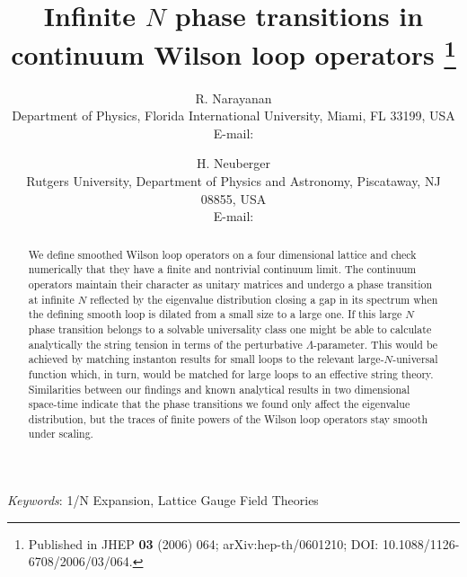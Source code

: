 \documentclass[11pt]{article}
\title{Infinite $N$ phase transitions in continuum Wilson loop operators%
\thanks{Published in JHEP {\bfseries 03} (2006) 064;
arXiv:hep-th/0601210; DOI: 10.1088/1126-6708/2006/03/064.}}
\author{R. Narayanan\\
Department of Physics, Florida International University, Miami,
FL 33199, USA\\
E-mail: \email{rajamani.narayanan@fiu.edu}
\and H. Neuberger\\
Rutgers University, Department of Physics and Astronomy,
Piscataway, NJ 08855, USA\\
E-mail: \email{neuberg@physics.rutgers.edu}}
\date{}
\begin{document}
\maketitle

\begin{abstract}
We define smoothed Wilson loop operators on a four
dimensional lattice and check numerically that they have a finite
and nontrivial continuum limit. The continuum operators maintain
their character as unitary matrices and undergo a phase transition
at infinite $N$ reflected by the eigenvalue distribution closing a
gap in its spectrum when the defining smooth loop is dilated from
a small size to a large one. If this large $N$ phase transition
belongs to a solvable universality class one might be able to
calculate analytically the string tension in terms of the
perturbative $\Lambda$-parameter.
This would be achieved by matching instanton results for
small loops to the relevant large-$N$-universal function
which, in turn, would be matched for large loops to
an effective string theory.
Similarities between our findings and known analytical results in
two dimensional space-time indicate that the phase transitions we
found only affect the eigenvalue distribution, but the traces of
finite powers of the Wilson loop operators stay smooth under
scaling.
\end{abstract}

\noindent\textit{Keywords}: 1/N Expansion, Lattice Gauge Field Theories

\bigskip







\end{document}
